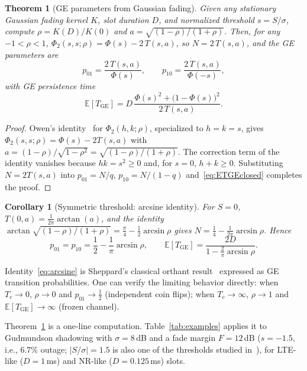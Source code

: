 \documentclass[conference]{IEEEtran}
\newtheorem{theorem}{Theorem}
\newtheorem{corollary}{Corollary}
\newcommand{\ETGE}{\mathbb{E}[T_{\mathrm{GE}}]}
\begin{document}
\begin{theorem}[GE parameters from Gaussian fading]\label{thm:owen}
Given any stationary Gaussian fading kernel $K$, slot duration $D$, and normalized threshold $s=S/\sigma$, compute $\rho=K(D)/K(0)$ and $a=\sqrt{(1-\rho)/(1+\rho)}$. Then, for any $-1<\rho<1$, $\Phi_2(s,s;\rho)=\Phi(s)-2\,T(s,a)$, so $N=2\,T(s,a)$, and the GE parameters are
\begin{equation}\label{eq:main}
p_{01}=\frac{2\,T(s,a)}{\Phi(s)},\qquad
p_{10}=\frac{2\,T(s,a)}{\Phi(-s)},
\end{equation}
with GE persistence time
\begin{equation}\label{eq:ETGEowen}
\ETGE=D\,\frac{\Phi(s)^2+\big(1-\Phi(s)\big)^2}{2\,T(s,a)}.
\end{equation}
\end{theorem}
\begin{proof}
Owen's identity~\cite{owen1956} for $\Phi_2(h,k;\rho)$, specialized to $h=k=s$, gives $\Phi_2(s,s;\rho)=\Phi(s)-2T(s,a)$ with $a=(1-\rho)/\sqrt{1-\rho^2}=\sqrt{(1-\rho)/(1+\rho)}$. The correction term of the identity vanishes because $hk=s^2\ge0$ and, for $s=0$, $h+k\ge0$. Substituting $N=2T(s,a)$ into $p_{01}=N/q$, $p_{10}=N/(1-q)$ and~\eqref{eq:ETGEclosed} completes the proof.
\end{proof}

\begin{corollary}[Symmetric threshold: arcsine identity]\label{cor:arcsine}
For $S=0$, $T(0,a)=\frac{1}{2\pi}\arctan(a)$, and the identity $\arctan\sqrt{(1-\rho)/(1+\rho)}=\frac{\pi}{4}-\frac12\arcsin\rho$ gives $N=\frac14-\frac{1}{2\pi}\arcsin\rho$. Hence
\begin{equation}\label{eq:arcsine}
p_{01}=p_{10}=\frac12-\frac1\pi\arcsin\rho,\qquad \ETGE=\frac{2D}{1-\frac{2}{\pi}\arcsin\rho}.
\end{equation}
\end{corollary}
Identity~\eqref{eq:arcsine} is Sheppard's classical orthant result~\cite{sheppard1900} expressed as GE transition probabilities. One can verify the limiting behavior directly: when $T_c\to0$, $\rho\to0$ and $p_{01}\to\frac12$ (independent coin flips); when $T_c\to\infty$, $\rho\to1$ and $\ETGE\to\infty$ (frozen channel).

Theorem~\ref{thm:owen} is a one-line computation. Table~\ref{tab:examples} applies it to Gudmundson shadowing with $\sigma=8$\,dB and a fade margin $F=12$\,dB ($s=-1.5$, i.e., $6.7\%$ outage; $|S/\sigma|=1.5$ is also one of the thresholds studied in~\cite{krishnamachari2026}), for LTE-like ($D=1$\,ms) and NR-like ($D=0.125$\,ms) slots.
\end{document}
